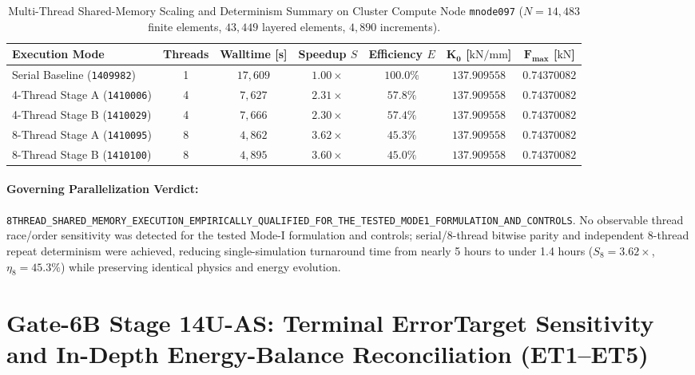 \begin{table}[htbp]
\centering
\small
\caption{Multi-Thread Shared-Memory Scaling and Determinism Summary on Cluster Compute Node \texttt{mnode097} ($N = 14{,}483$ finite elements, $43{,}449$ layered elements, $4{,}890$ increments).}
\label{tab:stage14uar_scaling_summary}
\begin{tabular}{l c c c c c c}
\toprule
\textbf{Execution Mode} & \textbf{Threads} & \textbf{Walltime [s]} & \textbf{Speedup $S$} & \textbf{Efficiency $E$} & $\mathbf{K_0}$ [$\mathrm{kN/mm}$] & $\mathbf{F_{\max}}$ [$\mathrm{kN}$] \\
\midrule
Serial Baseline (\texttt{1409982}) & 1 & $17{,}609$ & $1.00\times$ & $100.0\%$ & $137.909558$ & $0.74370082$ \\
4-Thread Stage A (\texttt{1410006}) & 4 & $7{,}627$ & $2.31\times$ & $57.8\%$ & $137.909558$ & $0.74370082$ \\
4-Thread Stage B (\texttt{1410029}) & 4 & $7{,}666$ & $2.30\times$ & $57.4\%$ & $137.909558$ & $0.74370082$ \\
8-Thread Stage A (\texttt{1410095}) & 8 & $4{,}862$ & $3.62\times$ & $45.3\%$ & $137.909558$ & $0.74370082$ \\
8-Thread Stage B (\texttt{1410100}) & 8 & $4{,}895$ & $3.60\times$ & $45.0\%$ & $137.909558$ & $0.74370082$ \\
\bottomrule
\end{tabular}
\end{table}

\paragraph{Governing Parallelization Verdict:}
\texttt{8THREAD\_SHARED\_MEMORY\_EXECUTION\_EMPIRICALLY\_QUALIFIED\_FOR\_THE\_TESTED\_MODE1\_FORMULATION\_AND\_CONTROLS}. No observable thread race/order sensitivity was detected for the tested Mode-I formulation and controls; serial/8-thread bitwise parity and independent 8-thread repeat determinism were achieved, reducing single-simulation turnaround time from nearly 5 hours to under 1.4 hours ($S_8 = 3.62\times$, $\eta_8 = 45.3\%$) while preserving identical physics and energy evolution.

\section{Gate-6B Stage 14U-AS: Terminal ErrorTarget Sensitivity and In-Depth Energy-Balance Reconciliation (ET1--ET5)}
\label{sec:stage14uas_errortarget_energy_reconciliation}

